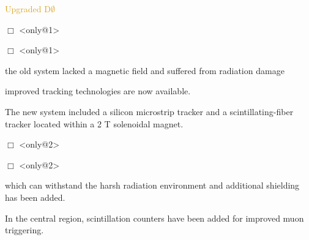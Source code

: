 \begin{frame}{\textcolor{Goldenrod}{Upgraded D$\emptyset$ }}
  \itt
\item[$\Box$]<only@1> 
  
\item[$\Box$]<only@1> 
  {\small
    \itt
  \item \alert{the old system lacked a magnetic field and suffered from radiation
      damage}
  \item improved tracking technologies are now available.\\
  \item The new system included a silicon microstrip tracker and a
    scintillating-fiber tracker located within a 2 T solenoidal
    magnet.
    \tti
  }
\item[$\Box$]<only@2> 
  
\item[$\Box$]<only@2> 
  {\small
    \itt
  \item which can withstand the harsh radiation environment and
    additional shielding has been added.
    
  \item \alert{In the central region,
      scintillation counters have been added for improved muon
      triggering.}
    \tti
  }
  \tti
\end{frame}


